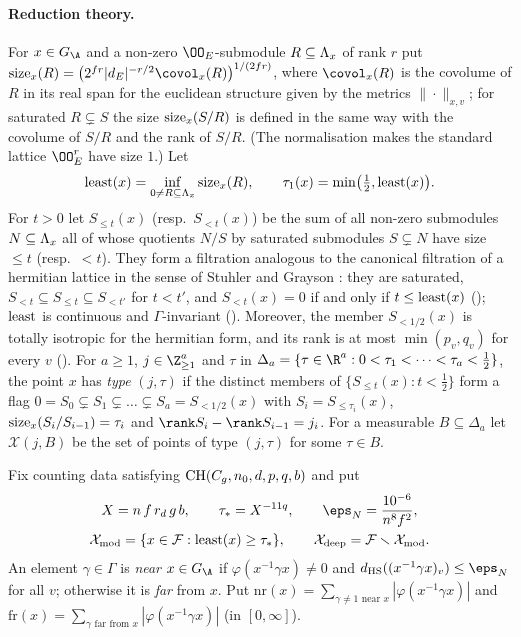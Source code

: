 \paragraph{Reduction theory.}
For $x\in\rowsGA$ and a non-zero $\OO_E$-submodule $R\subseteq\Lambda_x$ of rank $r$ put
$\rowssize_x(R)=\bigl(2^{fr}|d_E|^{-r/2}\covol_x(R)\bigr)^{1/(2fr)}$, where $\covol_x(R)$ is the covolume of $R$ in its
real span for the euclidean structure given by the metrics $\|\cdot\|_{x,v}$; for saturated $R\subsetneq S$ the size
$\operatorname{size}_x(S/R)$ is defined in the same way with the covolume of $S/R$ and the rank of $S/R$. (The normalisation makes
the standard lattice $\OO_E^r$ have size $1$.) Let
\[
\operatorname{least}(x)=\inf_{0\ne R\subseteq\Lambda_x}\operatorname{size}_x(R),\qquad \tau_1(x)=\min\bigl(\tfrac12,\operatorname{least}(x)\bigr).
\]
For $t>0$ let $S_{\le t}(x)$ (resp.\ $S_{<t}(x)$) be the sum of all non-zero submodules $N\subseteq\Lambda_x$ all of whose
quotients $N/S$ by saturated submodules $S\subsetneq N$ have size $\le t$ (resp.\ $<t$). They form a filtration analogous to
the canonical filtration of a hermitian lattice in the sense of Stuhler and Grayson \cite{Stuhler1976,Grayson1984}: they
are saturated,
$S_{<t}\subseteq S_{\le t}\subseteq S_{<t'}$ for $t<t'$, and $S_{<t}(x)=0$ if and only if $t\le\operatorname{least}(x)$
(); $\operatorname{least}$ is continuous and $\Gamma$-invariant
(). Moreover, the member $S_{<1/2}(x)$ is totally isotropic
for the hermitian form, and its rank is at most $\min(p_v,q_v)$ for every $v$
(). For $a\ge1$, $j\in\Z_{\ge1}^a$ and $\tau$ in
$\Delta_a=\{\tau\in\R^a:0<\tau_1<\dots<\tau_a<\frac12\}$, the point $x$ has \emph{type} $(j,\tau)$ if the distinct
members of $\{S_{\le t}(x):t<\frac12\}$ form a flag $0=S_0\subsetneq S_1\subsetneq\dots\subsetneq S_a=S_{<1/2}(x)$
with $S_i=S_{\le\tau_i}(x)$, $\operatorname{size}_x(S_i/S_{i-1})=\tau_i$ and $\rank S_i-\rank S_{i-1}=j_i$. For a measurable
$B\subseteq\Delta_a$ let $\mathcal X(j,B)$ be the set of points of type $(j,\tau)$ for some $\tau\in B$.

Fix counting data satisfying $\mathrm{CH}(C_g,n_0,d,p,q,b)$ and put
\begin{gather*}
X=n\,f\,r_d\,g\,b,\qquad \tau_*=X^{-11q},\qquad \eps_N=\frac{10^{-6}}{n^8f^2},\\
\rowsmod=\{x\in\mathcal F:\rowsleast(x)\ge\tau_*\},\qquad \rowsdeep=\mathcal F\smallsetminus\rowsmod .
\end{gather*}
An element $\gamma\in\Gamma$ is \emph{near} $x\in\rowsGA$ if $\varphi(x^{-1}\gamma x)\ne0$ and
$\rowsdHS((x^{-1}\gamma x)_v)\le\eps_N$ for all $v$; otherwise it is \emph{far} from $x$. Put
$\mathrm{nr}(x)=\sum_{\gamma\ne1\text{ near }x}|\varphi(x^{-1}\gamma x)|$ and
$\mathrm{fr}(x)=\sum_{\gamma\text{ far from }x}|\varphi(x^{-1}\gamma x)|$ (in $[0,\infty]$).

